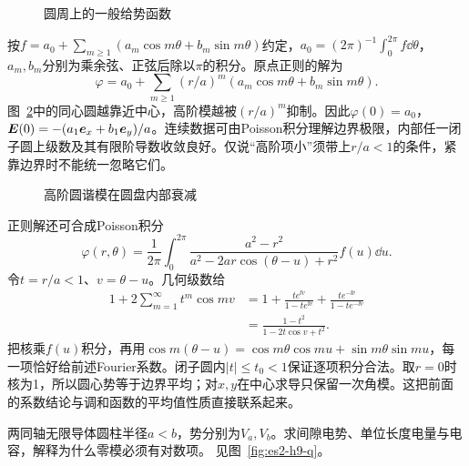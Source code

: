 \begin{figure}[H]\centering
{}
\caption{圆周上的一般给势函数}\label{fig:es2-h8-q}
\end{figure}
\begin{solution}
按$f=a_0+\sum_{m\ge1}(a_m\cos m\theta+b_m\sin m\theta)$约定，$a_0=(2\pi)^{-1}\int_0^{2\pi}f\dd\theta$，$a_m,b_m$分别为乘余弦、正弦后除以$\pi$的积分。原点正则的解为
\[\varphi=a_0+\sum_{m\ge1}(r/a)^m(a_m\cos m\theta+b_m\sin m\theta).
\]
图~\ref{fig:es2-h8-s}中的同心圆越靠近中心，高阶模越被$(r/a)^m$抑制。因此$\varphi(0)=a_0$，$\bm{E}(0)=-(a_1\bm{e}_x+b_1\bm{e}_y)/a$。连续数据可由Poisson积分理解边界极限，内部任一闭子圆上级数及其有限阶导数收敛良好。仅说“高阶项小”须带上$r/a<1$的条件，紧靠边界时不能统一忽略它们。
\begin{figure}[H]\centering
{}
\caption{高阶圆谐模在圆盘内部衰减}\label{fig:es2-h8-s}
\end{figure}


正则解还可合成Poisson积分
\[\varphi(r,\theta)=\frac1{2\pi}\int_0^{2\pi}\frac{a^2-r^2}{a^2-2ar\cos(\theta-u)+r^2}f(u)\dd u.
\]
令$t=r/a<1$、$v=\theta-u$。几何级数给
\[\begin{split}
1+2\sum_{m=1}^{\infty}t^m\cos mv
&=1+\frac{te^{\ii v}}{1-te^{\ii v}}+
\frac{te^{-\ii v}}{1-te^{-\ii v}}\\
&=\frac{1-t^2}{1-2t\cos v+t^2}.
\end{split}\]
把核乘$f(u)$积分，再用$\cos m(\theta-u)=\cos m\theta\cos mu+\sin m\theta\sin mu$，每一项恰好给前述Fourier系数。闭子圆内$|t|\le t_0<1$保证逐项积分合法。取$r=0$时核为1，所以圆心势等于边界平均；对$x,y$在中心求导只保留一次角模。这把前面的系数结论与调和函数的平均值性质直接联系起来。
\end{solution}

\begin{exercise}[环域中的对数零模]\label{ex:es2-h9}
两同轴无限导体圆柱半径$a<b$，势分别为$V_a,V_b$。求间隙电势、单位长度电量与电容，解释为什么零模必须有对数项。 见图~\ref{fig:es2-h9-q}。
\end{exercise}

